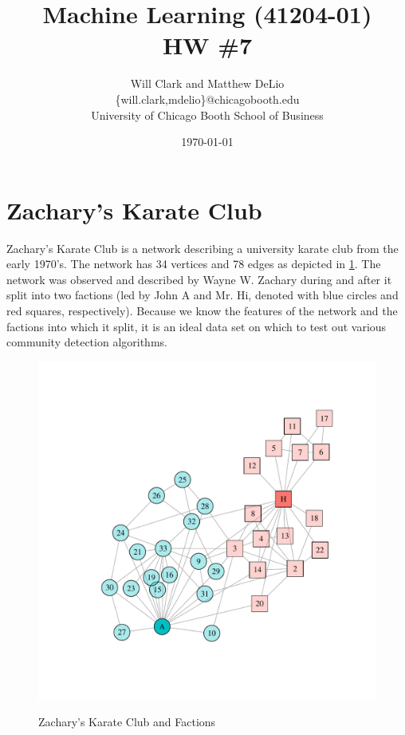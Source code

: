 



\title{Machine Learning (41204-01)\\HW \#7}
\author{Will Clark and Matthew DeLio \\
\textsf{\{will.clark,mdelio\}@chicagobooth.edu} \\
University of Chicago Booth School of Business}
\date{\today}
\maketitle

\section{Zachary's Karate Club}

Zachary's Karate Club is a network describing a university karate club from the early 1970's. The network has 34 vertices and 78 edges as depicted in \cref{fig:karate_network}. The network was observed and described by Wayne W. Zachary during and after it split into two factions (led by John A and Mr. Hi, denoted with blue circles and red squares, respectively). Because we know the features of the network and the factions into which it split, it is an ideal data set on which to test out various community detection algorithms.

\begin{figure}[!htb]
\centering
\caption{Zachary's Karate Club and Factions}
\includegraphics[scale=.5,trim={0.75in 0.75in 0.75in 0.75in}, clip=True]{karate_network.pdf}
\label{fig:karate_network}
\end{figure}

